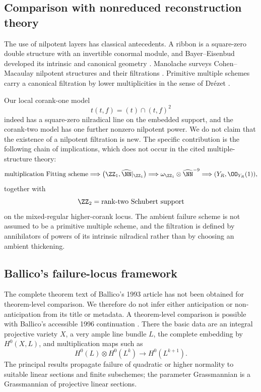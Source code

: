\subsection{Comparison with nonreduced reconstruction theory}

The use of nilpotent layers has classical antecedents.  A ribbon is a
square-zero double structure with an invertible conormal module, and
Bayer--Eisenbud developed its intrinsic and canonical geometry
\cite{BayerEisenbud}.  Manolache surveys Cohen--Macaulay nilpotent
structures and their filtrations \cite{Manolache}.  Primitive multiple
schemes carry a canonical filtration by lower multiplicities in the
sense of Drézet \cite{Drezet}.

Our local corank-one model
\[
 t(t,f)=(t)\cap(t,f)^2
\]
indeed has a square-zero nilradical line on the embedded support, and
the corank-two model has one further nonzero nilpotent power.  We do
not claim that the existence of a nilpotent filtration is new.  The
specific contribution is the following chain of implications, which
does not occur in the cited multiple-structure theory:
\[
 \text{multiplication Fitting scheme}
 \Longrightarrow
 \bigl(\ZZ_1,\widehat\NN|_{\ZZ_1}\bigr)
 \Longrightarrow
 \omega_{\ZZ_1}\otimes\widehat\NN^{-9}
 \Longrightarrow
 (Y_R,\OO_{Y_R}(1)),
\]
together with
\[
 \ZZ_2=\text{rank-two Schubert support}
\]
on the mixed-regular higher-corank locus.  The ambient failure scheme
is not assumed to be a primitive multiple scheme, and the filtration
is defined by annihilators of powers of its intrinsic nilradical
rather than by choosing an ambient thickening.

\subsection{Ballico's failure-locus framework}

The complete theorem text of Ballico's 1993 article
\cite{Ballico93} has not been obtained for theorem-level comparison.  We therefore do
not infer either anticipation or non-anticipation from its title or
metadata.  A theorem-level comparison is possible with Ballico's
accessible 1996 continuation \cite{Ballico96}.  There the basic data
are an integral projective variety $X$, a very ample line bundle $L$,
the complete embedding by $H^0(X,L)$, and multiplication maps such as
\[
 H^0(L)\otimes H^0(L^k)\longrightarrow H^0(L^{k+1}).
\]
The principal results propagate failure of quadratic or higher
normality to suitable linear sections and finite subschemes; the
parameter Grassmannian is a Grassmannian of projective linear
sections.

